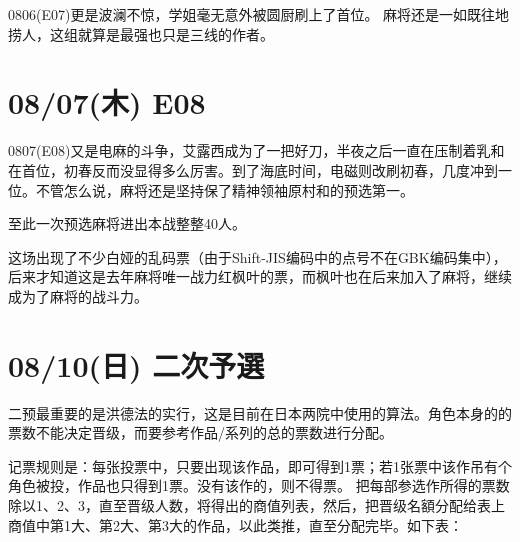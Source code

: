 0806(E07)更是波澜不惊，学姐毫无意外被圆厨刷上了首位。
麻将还是一如既往地捞人，这组就算是最强也只是三线的作者。

\section{08/07(木) E08}


0807(E08)又是电麻的斗争，艾露西成为了一把好刀，半夜之后一直在压制着乳和在首位，初春反而没显得多么厉害。到了海底时间，电磁则改刷初春，几度冲到一位。不管怎么说，麻将还是坚持保了精神领袖原村和的预选第一。

至此一次预选麻将进出本战整整40人。

这场出现了不少白娅的乱码票（由于Shift-JIS编码中的点号不在GBK编码集中），后来才知道这是去年麻将唯一战力红枫叶的票，而枫叶也在后来加入了麻将，继续成为了麻将的战斗力。

\section{08/10(日) 二次予選}

二预最重要的是洪德法的实行，这是目前在日本两院中使用的算法。角色本身的的票数不能决定晋级，而要参考作品/系列的总的票数进行分配。

记票规则是：每张投票中，只要出现该作品，即可得到1票；若1张票中该作吊有个角色被投，作品也只得到1票。没有该作的，则不得票。
把每部参选作所得的票数除以1、2、3，直至晋级人数，将得出的商值列表，然后，把晋级名額分配给表上商值中第1大、第2大、第3大的作品，以此类推，直至分配完毕。如下表：

